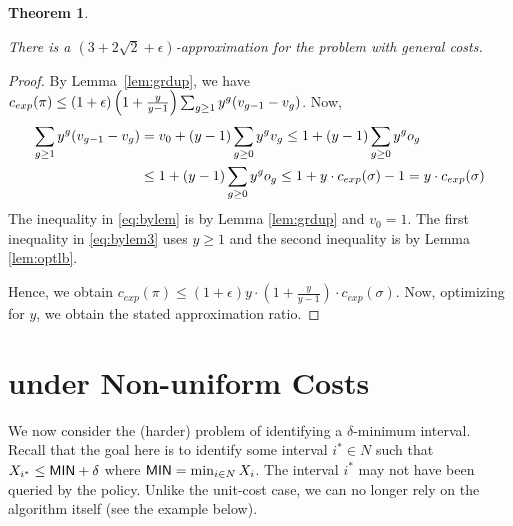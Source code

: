 \documentclass[11pt]{article}
\newcommand{\base}{y}
\newtheorem{thm}{Theorem}[section]
\theoremstyle{remark}
\theoremstyle{plain}
\theoremstyle{remark}
\begin{document}
\begin{thm}
\label{thm:gencost}

    There is a $( 3+ 2\sqrt{2} + \epsilon)$-approximation for the \smq problem with general costs.  
\end{thm}

\begin{proof} By Lemma~\ref{lem:grdup}, we have   $c_{exp}(\pi)  \leq (1 + \epsilon)  \left(1+ \frac{\base}{\base-1}  \right) \sum_{\i \ge 1}{{\base}^\i(v_{\i-1} - v_\i)}$. Now, 
    \begin{align}
        \sum_{\i \ge 1} {\base}^\i(v_{\i-1} - v_\i) & = v_0 + (y-1) \sum_{\i \ge 0} {\base}^\i v_{\i}  \le 1 + (y-1) \sum_{\i \ge 0} {\base}^\i o_{\i} \label{eq:bylem}\\
        &  \le 1+(y-1) \sum_{\i \ge 0} {\base}^\i o_{\i}  \leq 1+ y\cdot c_{exp}(\sigma) - 1 = y\cdot c_{exp}(\sigma) \label{eq:bylem3}
    \end{align}
The inequality in \eqref{eq:bylem} is by Lemma \ref{lem:grdup} and $v_0=1$.  The first inequality in  \eqref{eq:bylem3} uses $y\ge1$ and the second inequality is by Lemma \ref{lem:optlb}. 

Hence, we obtain $c_{exp}(\pi)  \leq (1 + \epsilon)  y\cdot \left(1+ \frac{\base}{\base-1}   \right) \cdot  c_{exp}(\sigma)$. Now, optimizing for $y$, we obtain the stated approximation ratio.
\end{proof}





\section{\smqi under Non-uniform Costs}
We now consider the (harder) problem of identifying a $\delta$-minimum interval. Recall that the goal here is  to identify some interval $i^*\in N$ such that $X_{i^*}\le {\sf MIN} +\delta$ where  ${\sf MIN}=\min_{i\in N} X_i$. The interval $i^*$ may not have been queried by the policy. Unlike the unit-cost case, we can no longer rely on the \smq algorithm itself (see the example below). 
\end{document}
